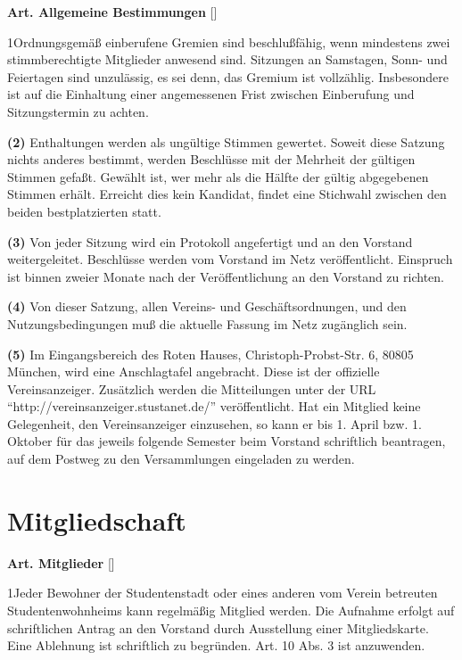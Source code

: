 \documentclass[12pt]{article}
\newcommand{\Abschnitt}[1]{\section{#1}}
\newcommand{\Satz}[2]{

\begin{samepage}
{\bf (#1)} #2
\end{samepage}
}
\newenvironment{Artikel}[2]{
\bigskip \centerline{{\bf Art. #1} [#2]}
\nopagebreak
}{
}
\begin{document}
\begin{Artikel}{5}{Allgemeine Bestimmungen}

\Satz{1}{Ordnungsgemäß einberufene Gremien sind beschlußfähig, wenn mindestens
zwei stimmberechtigte Mitglieder anwesend sind. Sitzungen an Samstagen, Sonn-
und Feiertagen sind unzulässig, es sei denn, das Gremium ist vollzählig.
Insbesondere ist auf die Einhaltung einer angemessenen Frist zwischen
Einberufung und Sitzungstermin zu achten.}

\Satz{2}{Enthaltungen werden als ungültige Stimmen gewertet. Soweit diese
Satzung nichts anderes bestimmt, werden Beschlüsse mit der Mehrheit der
gültigen Stimmen gefaßt. Gewählt ist, wer mehr als die Hälfte der gültig
abgegebenen Stimmen erhält. Erreicht dies kein Kandidat, findet eine Stichwahl
zwischen den beiden bestplatzierten statt.}

\Satz{3}{Von jeder Sitzung wird ein Protokoll angefertigt und an den Vorstand
weitergeleitet. Beschlüsse werden vom Vorstand im Netz veröffentlicht.
Einspruch ist binnen zweier Monate nach der Veröffentlichung an den Vorstand zu
richten.}

\Satz{4}{Von dieser Satzung, allen Vereins- und Geschäftsordnungen, und den
Nutzungsbedingungen muß die aktuelle Fassung im Netz zugänglich sein.}

\Satz{5}{Im Eingangsbereich des Roten Hauses, Christoph-Probst-Str. 6, 80805
Mün\-chen, wird eine Anschlagtafel angebracht. Diese ist der offizielle
Vereinsanzeiger. Zusätzlich werden die Mitteilungen unter der URL
"`http://vereinsanzeiger.stustanet.de/"' veröffentlicht.  Hat ein Mitglied
keine Gelegenheit, den Vereinsanzeiger einzusehen, so kann er bis 1. April bzw.
1. Oktober für das jeweils folgende Semester beim Vorstand schriftlich
beantragen, auf dem Postweg zu den Versammlungen eingeladen zu werden.}

\end{Artikel}

\Abschnitt{Mitgliedschaft}

\begin{Artikel}{6}{Mitglieder}

\Satz{1}{Jeder Bewohner der Studentenstadt oder eines anderen vom Verein
betreuten Studentenwohnheims kann regelmäßig Mitglied werden. 
Die Aufnahme erfolgt auf schriftlichen Antrag an den Vorstand durch Ausstellung
einer Mitgliedskarte. Eine Ablehnung ist schriftlich zu begründen.  Art. 10
Abs. 3 ist anzuwenden.}

\end{Artikel}
\end{document}
